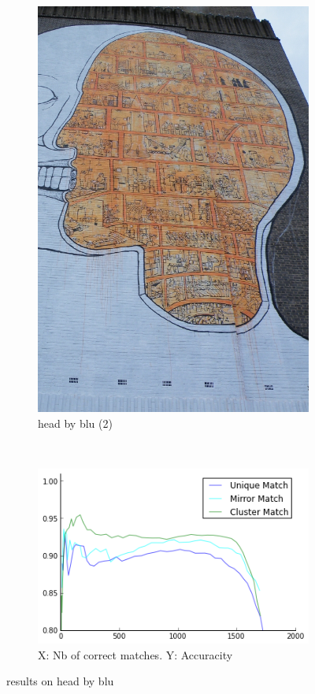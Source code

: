 \documentclass{article}
\begin{document}
\begin{figure}
{\begin{subfigure}[t]{0.25\textwidth}
			\includegraphics[width=\textwidth]{images/blu_head_2}
			\caption{head by blu (2)}
			\label{fig:head2}
		\end{subfigure}%
		~ %
		\begin{subfigure}[t]{0.55\textwidth}
			\centering
			\includegraphics[width=\textwidth]{images/result_blu_head}
			\caption{X: Nb of correct matches. Y: Accuracity}
			\label{fig:result_head}
		\end{subfigure}%
	}%
	\label{fig:head}
	\caption{results on head by blu}
\end{figure}
\end{document}
